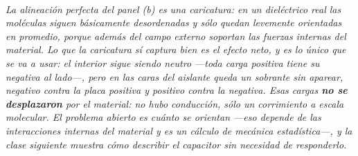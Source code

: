\begin{center}
\\[0.5em]
{\small\itshape La alineación perfecta del panel (b) es una caricatura: en un
dieléctrico real las moléculas siguen básicamente desordenadas y sólo quedan
\emph{levemente} orientadas en promedio, porque además del campo externo
soportan las fuerzas internas del material. Lo que la caricatura sí captura bien
es el efecto neto, y es lo único que se va a usar: el interior sigue siendo
neutro ---toda carga positiva tiene su negativa al lado---, pero en las caras
del aislante queda un sobrante sin aparear, negativo contra la placa positiva y
positivo contra la negativa. Esas cargas \textbf{no se desplazaron} por el
material: no hubo conducción, sólo un corrimiento a escala molecular. El
problema abierto es cuánto se orientan ---eso depende de las interacciones
internas del material y es un cálculo de mecánica estadística---, y la clase
siguiente muestra cómo describir el capacitor sin necesidad de responderlo.}
\end{center}
